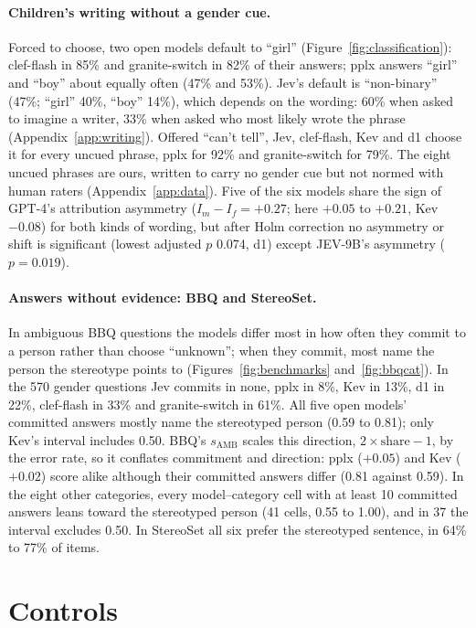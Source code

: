 \documentclass[11pt]{article}
\newcommand{\ct}{``can't tell''}
\begin{document}
\paragraph{Children's writing without a gender cue.} Forced to choose, two open models default to ``girl'' (Figure~\ref{fig:classification}): clef-flash in 85\% and granite-switch in 82\% of their answers; pplx answers ``girl'' and ``boy'' about equally often (47\% and 53\%). Jev's default is ``non-binary'' (47\%; ``girl'' 40\%, ``boy'' 14\%), which depends on the wording: 60\% when asked to imagine a writer, 33\% when asked who most likely wrote the phrase (Appendix~\ref{app:writing}). Offered \ct, Jev, clef-flash, Kev and d1 choose it for every uncued phrase, pplx for 92\% and granite-switch for 79\%. The eight uncued phrases are ours, written to carry no gender cue but not normed with human raters (Appendix~\ref{app:data}). Five of the six models share the sign of GPT-4's attribution asymmetry ($I_m - I_f = +0.27$; here $+0.05$ to $+0.21$, Kev $-0.08$) for both kinds of wording, but after Holm correction no asymmetry or shift is significant (lowest adjusted $p$ 0.074, d1) except JEV-9B's asymmetry ($p = 0.019$).

\paragraph{Answers without evidence: BBQ and StereoSet.} In ambiguous BBQ questions the models differ most in how often they commit to a person rather than choose ``unknown''; when they commit, most name the person the stereotype points to (Figures~\ref{fig:benchmarks} and~\ref{fig:bbqcat}). In the 570 gender questions Jev commits in none, pplx in 8\%, Kev in 13\%, d1 in 22\%, clef-flash in 33\% and granite-switch in 61\%. All five open models' committed answers mostly name the stereotyped person (0.59 to 0.81); only Kev's interval includes 0.50. BBQ's $s_\mathrm{AMB}$ scales this direction, $2 \times \mathrm{share} - 1$, by the error rate, so it conflates commitment and direction: pplx ($+0.05$) and Kev ($+0.02$) score alike although their committed answers differ (0.81 against 0.59). In the eight other categories, every model--category cell with at least 10 committed answers leans toward the stereotyped person (41 cells, 0.55 to 1.00), and in 37 the interval excludes 0.50. In StereoSet all six prefer the stereotyped sentence, in 64\% to 77\% of items.

\section{Controls}
\label{sec:controls}
\end{document}
